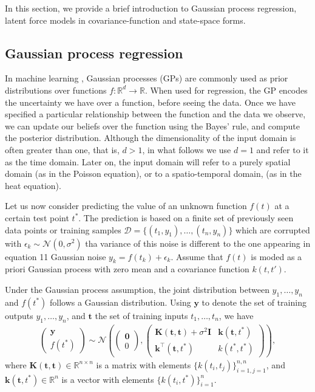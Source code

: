 \documentclass[journal]{IEEEtran}
\newcommand{\mauricio}[1]{{\color{blue}#1}}
\begin{document}
In this section, we provide a brief introduction to Gaussian process regression, latent force models in covariance-function and state-space forms.


\subsection{Gaussian process regression}\label{sec:gp:regression}
%

In machine learning \cite{Rasmussen+Williams:2006}, Gaussian processes (GPs) are commonly used as prior distributions over functions $f: \mathbb{R}^d\rightarrow \mathbb{R}$. When used for regression, the GP encodes the uncertainty we have over a function, before seeing the data. Once we have specified a particular relationship between the function and the data we observe, we can update our beliefs over the function using the Bayes' rule, and compute the posterior distribution.  Although the dimensionality of the input domain is often greater than one, that is, $d>1$, in what follows we use $d=1$ and refer to it as the time domain. Later on, the input domain will refer to a purely spatial domain (as in the Poisson equation), or to a spatio-temporal domain, (as in the heat equation). 

Let us now consider predicting the value of an unknown function $f(t)$ at a certain test point $t^*$. The prediction is
based on a finite set of previously seen data points or training samples $\mathcal{D}=\{(t_1, y_1), \ldots, (t_n,
y_n)\}$ which are corrupted with \mauricio{$\epsilon_k \sim \mathcal{N}(0,\sigma^2)$ tha variance of this noise is
  different to the one appearing in equation 11} Gaussian noise $y_k = f(t_k) + \epsilon_k$. Assume that $f(t)$ is moded as a priori Gaussian process with zero mean and a covariance function $k(t,t')$.

Under the Gaussian process assumption, the joint distribution between $y_1, \ldots, y_n$ and $f(t^*)$ follows a Gaussian distribution. Using $\mathbf{y}$ to denote the set of training outputs $y_1, \ldots, y_n$, and $\mathbf{t}$ the set of training inputs $t_1, \ldots, t_n$, we have
\begin{align*}
\begin{pmatrix}
\mathbf{y}\\
f(t^*)
\end{pmatrix}\sim
\mathcal{N}
\left(
\begin{pmatrix}
\mathbf{0}\\
0
\end{pmatrix},
\begin{pmatrix}
\mathbf{K}(\mathbf{t}, \mathbf{t}) + \sigma^2 \mathbf{I} & \mathbf{k}(\mathbf{t}, t^*)\\
\mathbf{k}^{\top}(\mathbf{t}, t^*) & k(t^*, t^*)
\end{pmatrix}
\right),
\end{align*}
where $\mathbf{K}(\mathbf{t}, \mathbf{t})\in \mathbb{R}^{n\times n}$ is a matrix with elements
$\{k(t_i, t_j)\}_{i=1, j=1}^{n,n}$, and $\mathbf{k}(\mathbf{t}, t^*) \in \mathbb{R}^n$ is a vector with elements
$\{k(t_i, t^*)\}_{i=1}^n$.
\end{document}
